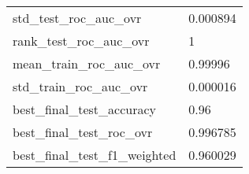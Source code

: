 \begin{tabular}{ll}
std\_test\_roc\_auc\_ovr          &                                           0.000894 \\
rank\_test\_roc\_auc\_ovr         &                                                  1 \\
mean\_train\_roc\_auc\_ovr        &                                            0.99996 \\
std\_train\_roc\_auc\_ovr         &                                           0.000016 \\
best\_final\_test\_accuracy      &                                               0.96 \\
best\_final\_test\_roc\_ovr       &                                           0.996785 \\
best\_final\_test\_f1\_weighted   &                                           0.960029 \\
\bottomrule
\end{tabular}
